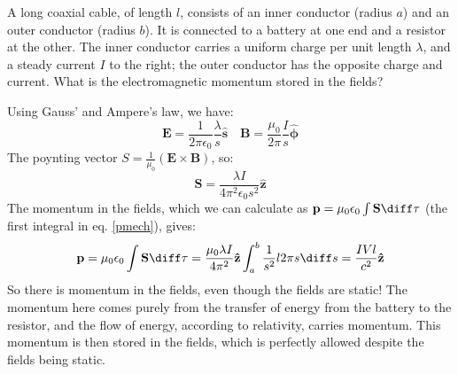 \documentclass[10pt]{article}
\begin{document}
	\begin{example}
		A long coaxial cable, of length \( l \), consists of an inner conductor (radius \( a \)) and an outer
		conductor (radius \( b \)). It is connected to a battery at one end and a resistor at the other. The
		inner conductor carries a uniform charge per unit length \( \lambda \), and a steady current \( I \)
		to the right; the outer conductor has the opposite charge and current. What is the electromagnetic
		momentum stored in the fields?

		\begin{solution}
			Using Gauss' and Ampere's law, we have:
			\[
				\mathbf{E} = \frac{1}{2 \pi \epsilon_0} \frac{\lambda}{s} \hat{\mathbf{s}} \quad 
				\mathbf{B} = \frac{\mu_0}{2\pi}\frac{I}{s}\hat{\boldsymbol{\phi}}
			\]
			The poynting vector \( S = \frac{1}{\mu_0}(\mathbf{E} \times \mathbf{B}) \), so:
			\[
				\mathbf{S} = \frac{\lambda I}{4 \pi^2 \epsilon_0 s^2}\mathbf{\hat{z}}
			\]
			The momentum in the fields, which we can calculate as \( \mathbf{p} = \mu_0 \epsilon_0 \int
			\mathbf{S} \diff \tau \) (the first integral in eq. \ref{pmech}), gives:
			\[
				\mathbf{p} = \mu_0 \epsilon_0 \int \mathbf{S} \diff \tau = \frac{\mu_0 \lambda I}{4\pi^2}
				\mathbf{\hat{z}}\int_a^b \frac{1}{s^2}l 2\pi s \diff s = \frac{IVl}{c^2}\mathbf{\hat{z}}
			\]
			So there is momentum in the fields, even though the fields are static! The momentum here comes
			purely from the transfer of energy from the battery to the resistor, and the flow of energy,
			according to relativity, carries momentum. This momentum is then stored in the fields, which is
			perfectly allowed despite the fields being static.    
		\end{solution}
	\end{example}
\end{document}
